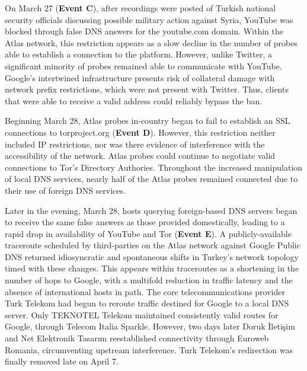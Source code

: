 On March 27 (\textbf{Event C}), after recordings were posted of Turkish
national security officials discussing possible military action against Syria,
YouTube was blocked through false DNS answers for the youtube.com domain.
Within the Atlas network, this restriction appears as a slow decline in the
number of probes able to establish a connection to the platform. However, unlike Twitter, a
significant minority of probes remained able to communicate with YouTube.
Google's intertwined infrastructure presents risk of collateral damage with network prefix restrictions, which were not
present with Twitter. Thus, clients that were able to receive a valid address could reliably bypass the ban.

Beginning
March 28, Atlas probes in-country began to fail to establish an SSL
connections to torproject.org (\textbf{Event D}). However, this restriction
neither included IP restrictions, nor was there evidence of interference with
the accessibility of the network. Atlas probes could continue to negotiate
valid connections to Tor's Directory Authories. Throughout the increased
manipulation of local DNS services, nearly half of the Atlas probes remained
connected due to their use of foreign DNS services.

Later in the evening, March 28, hosts querying foreign-based DNS servers began to
receive the same false answers as those provided domestically, leading to a
rapid drop in availability of YouTube and Tor (\textbf{Event E}). A
publicly-available traceroute scheduled by third-parties on the Atlas network 
against Google Public DNS returned idiosyncratic and
spontaneous shifts in Turkey's network topology timed with these
changes. This appears within traceroutes as a shortening in the
number of hops to Google, with a multifold reduction in traffic latency and the
absence of international hosts in path. The core telecommunications provider
Turk Telekom had begun to reroute traffic destined for Google to a local DNS
server. Only TEKNOTEL Telekom maintained
consistently valid routes for Google, through Telecom Italia
Sparkle. However, two days later Doruk \.{I}leti\c{s}im and Net Elektronik
Tasar{\i}m reestablished connectivity through Euroweb Romania, circumventing upstream interference. Turk Telekom's redirection was finally removed late on April 7.

